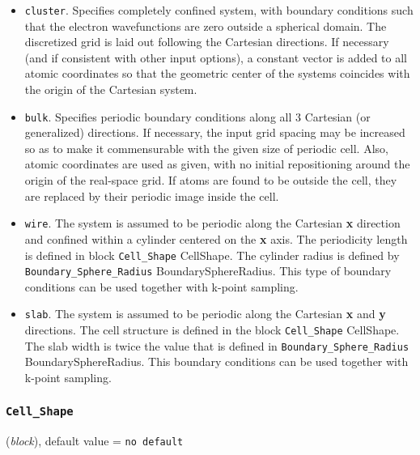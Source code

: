 \documentclass{article}
\begin{document}
    \begin{itemize}
    \item{\tt cluster}. Specifies completely confined system, with boundary
    conditions such that the electron wavefunctions are zero outside a spherical
    domain. The discretized grid is laid out following the Cartesian
    directions. If necessary (and if
    consistent with other input options), a constant vector is added to all
    atomic coordinates so that the geometric center of the systems coincides with
    the origin of the Cartesian system.
    
    \item {\tt bulk}. Specifies periodic boundary conditions along all
    3 Cartesian (or generalized) directions. If necessary, the input grid
    spacing may be increased so as to
    make it commensurable with the given size of periodic cell. Also, atomic
    coordinates are used as given, with no initial repositioning around the origin
    of the real-space grid. If atoms are found to be outside the cell, they are
    replaced by their periodic image inside the cell.
    
    \item {\tt wire}. The
    system is assumed to be periodic along the Cartesian {\bf x} direction
    and confined within a cylinder centered on the {\bf x} axis. The
    periodicity length is defined in block {\tt Cell\_Shape}
    {CellShape}. The cylinder radius is defined by {\tt
    Boundary\_Sphere\_Radius} {BoundarySphereRadius}. This type of
    boundary conditions can be used together with k-point sampling.
    
    \item {\tt slab}. The system is assumed to be periodic along the
    Cartesian {\bf x} and {\bf y} directions. The cell structure is defined
    in the block {\tt Cell\_Shape} {CellShape}. The slab width is 
    twice the value that is defined in  {\tt Boundary\_Sphere\_Radius} 
    {BoundarySphereRadius}. This boundary conditions can be used together with
    k-point sampling. 
    \end{itemize}



\subsubsection{\tt Cell\_Shape 
\label{CellShape}}
({\it block}),
default value = {\tt no default }
\end{document}
